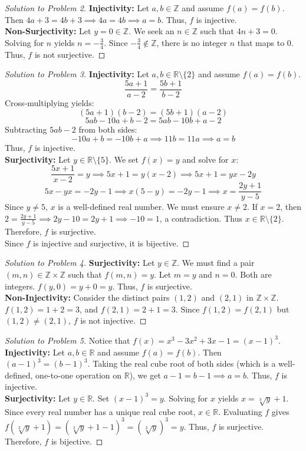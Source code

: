 \documentclass[11pt, letterpaper]{article}
\theoremstyle{definition}
\theoremstyle{remark}
\newcommand{\R}{\mathbb{R}}
\newcommand{\Z}{\mathbb{Z}}
\begin{document}
\begin{proof}[Solution to Problem 2]
\textbf{Injectivity:} Let $a, b \in \Z$ and assume $f(a) = f(b)$. Then $4a + 3 = 4b + 3 \implies 4a = 4b \implies a = b$. Thus, $f$ is injective. \\
\textbf{Non-Surjectivity:} Let $y = 0 \in \Z$. We seek an $n \in \Z$ such that $4n + 3 = 0$. Solving for $n$ yields $n = -\frac{3}{4}$. Since $-\frac{3}{4} \notin \Z$, there is no integer $n$ that maps to 0. Thus, $f$ is not surjective.
\end{proof}

\begin{proof}[Solution to Problem 3]
\textbf{Injectivity:} Let $a, b \in \R \setminus \{2\}$ and assume $f(a) = f(b)$. 
\[ \frac{5a+1}{a-2} = \frac{5b+1}{b-2} \]
Cross-multiplying yields:
\[ (5a+1)(b-2) = (5b+1)(a-2) \]
\[ 5ab - 10a + b - 2 = 5ab - 10b + a - 2 \]
Subtracting $5ab - 2$ from both sides:
\[ -10a + b = -10b + a \implies 11b = 11a \implies a = b \]
Thus, $f$ is injective. \\
\textbf{Surjectivity:} Let $y \in \R \setminus \{5\}$. We set $f(x) = y$ and solve for $x$:
\[ \frac{5x+1}{x-2} = y \implies 5x + 1 = y(x - 2) \implies 5x + 1 = yx - 2y \]
\[ 5x - yx = -2y - 1 \implies x(5 - y) = -2y - 1 \implies x = \frac{2y + 1}{y - 5} \]
Since $y \neq 5$, $x$ is a well-defined real number. We must ensure $x \neq 2$. If $x = 2$, then $2 = \frac{2y+1}{y-5} \implies 2y - 10 = 2y + 1 \implies -10 = 1$, a contradiction. Thus $x \in \R \setminus \{2\}$. Therefore, $f$ is surjective. \\
Since $f$ is injective and surjective, it is bijective.
\end{proof}

\begin{proof}[Solution to Problem 4]
\textbf{Surjectivity:} Let $y \in \Z$. We must find a pair $(m,n) \in \Z \times \Z$ such that $f(m,n) = y$. Let $m = y$ and $n = 0$. Both are integers. $f(y, 0) = y + 0 = y$. Thus, $f$ is surjective. \\
\textbf{Non-Injectivity:} Consider the distinct pairs $(1, 2)$ and $(2, 1)$ in $\Z \times \Z$. $f(1, 2) = 1 + 2 = 3$, and $f(2, 1) = 2 + 1 = 3$. Since $f(1, 2) = f(2, 1)$ but $(1, 2) \neq (2, 1)$, $f$ is not injective.
\end{proof}

\begin{proof}[Solution to Problem 5]
Notice that $f(x) = x^3 - 3x^2 + 3x - 1 = (x - 1)^3$. \\
\textbf{Injectivity:} Let $a, b \in \R$ and assume $f(a) = f(b)$. Then $(a - 1)^3 = (b - 1)^3$. Taking the real cube root of both sides (which is a well-defined, one-to-one operation on $\R$), we get $a - 1 = b - 1 \implies a = b$. Thus, $f$ is injective. \\
\textbf{Surjectivity:} Let $y \in \R$. Set $(x - 1)^3 = y$. Solving for $x$ yields $x = \sqrt[3]{y} + 1$. Since every real number has a unique real cube root, $x \in \R$. Evaluating $f$ gives $f(\sqrt[3]{y} + 1) = (\sqrt[3]{y} + 1 - 1)^3 = (\sqrt[3]{y})^3 = y$. Thus, $f$ is surjective. \\
Therefore, $f$ is bijective.
\end{proof}
\end{document}
